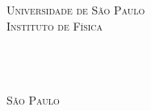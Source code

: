 \begin{titlepage}
\begin{fullwidth}
\begin{center}


\textsc{\LARGE Universidade de São Paulo \\ Instituto de Física}\\[3cm]

\HRule \\[0.4cm]
\textsc{\textit{\titlefont {\titletext}\\[1.0cm] \subtitlefont {\subtitletext}}}
\HRule\\[2.2cm]
\textsc{\LARGE \authorinfo }
\vfill

\textsc{\LARGE São Paulo}\\
\textsc{\LARGE \the\year}

\end{center}
\end{fullwidth}
\end{titlepage}